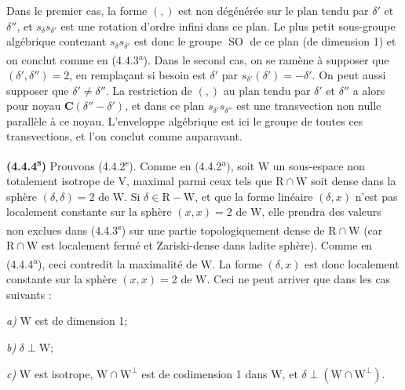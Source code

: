 \documentclass[11pt,leqno]{article}
\begin{document}
Dans le premier cas, la forme \((,)\) est non dégénérée sur le plan tendu par \(\delta'\) et \(\delta''\), et \(s_\delta s_{\delta'}\) est une rotation d’ordre infini dans ce plan. Le plus petit sous-groupe algébrique contenant \(s_\delta s_{\delta'}\) est donc le groupe \(\operatorname{SO}\) de ce plan (de dimension 1) et on conclut comme en (4.4.3\textsuperscript{a}). Dans le second cas, on se ramène à supposer que \((\delta',\delta'')=2\), en remplaçant si besoin est \(\delta'\) par \(s_{\delta'}(\delta')=-\delta'\). On peut aussi supposer que \(\delta'\neq\delta''\). La restriction de \((,)\) au plan tendu par \(\delta'\) et \(\delta''\) a alors pour noyau \(\mathbf{C}(\delta''-\delta')\), et dans ce plan \(s_{\delta'}s_{\delta''}\) est une transvection non nulle parallèle à ce noyau. L’enveloppe algébrique est ici le groupe de toutes ces transvections, et l’on conclut comme auparavant.

\textbf{(4.4.4\textsuperscript{s})} Prouvons (4.4.2\textsuperscript{s}). Comme en (4.4.2\textsuperscript{a}), soit \(\mathrm{W}\) un sous-espace non totalement isotrope de \(\mathrm{V}\), maximal parmi ceux tels que \(\mathrm{R}\cap\mathrm{W}\) soit dense dans la sphère \((\delta,\delta)=2\) de \(\mathrm{W}\). Si \(\delta\in\mathrm{R}-\mathrm{W}\), et que la forme linéaire \((\delta,x)\) n’est pas localement constante sur la sphère \((x,x)=2\) de \(\mathrm{W}\), elle prendra des valeurs non exclues dans (4.4.3\textsuperscript{s}) sur une partie topologiquement dense de \(\mathrm{R}\cap\mathrm{W}\) (car \(\mathrm{R}\cap\mathrm{W}\) est localement fermé et Zariski-dense dans ladite sphère). Comme en (4.4.4\textsuperscript{a}), ceci contredit la maximalité de \(\mathrm{W}\). La forme \((\delta,x)\) est donc localement constante sur la sphère \((x,x)=2\) de \(\mathrm{W}\). Ceci ne peut arriver que dans les cas suivants :
\par\noindent\textit{a)} \(\mathrm{W}\) est de dimension 1;
\par\noindent\textit{b)} \(\delta\perp\mathrm{W}\);
\par\noindent\textit{c)} \(\mathrm{W}\) est isotrope, \(\mathrm{W}\cap\mathrm{W}^{\perp}\) est de codimension 1 dans \(\mathrm{W}\), et \(\delta\perp(\mathrm{W}\cap\mathrm{W}^{\perp})\).
\end{document}
